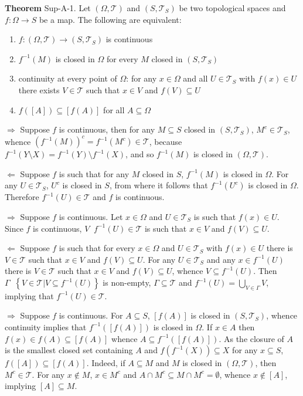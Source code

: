 \documentclass[a4paper]{article}
\newcommand{\obj}[1]{\left\{ #1 \right \}}
\newcommand{\clo}[1]{\left [ #1 \right ]}
\newcommand{\brac}[1]{\left ( #1 \right )}
\newcommand{\induc}[1]{\left . #1 \right \vert}
\newcommand{\Tcal}{\mathcal{T}}
\newcommand{\defn}{\mathop{\overset{\Delta}{=}}\nolimits}
\begin{document}
\label{thm:continuity} \noindent \textbf{Theorem} Sup-A-1.
Let $\brac{\Omega,\Tcal}$ and $\brac{S,\Tcal_S}$ be two topological spaces and $f:\Omega\to S$ be a map. The following are equivalent:
\begin{enumerate}
	\item $f:\brac{\Omega, \Tcal}\to\brac{S, \Tcal_S}$ is continuous
	\item $f^{-1}\brac{M}$ is closed in $\Omega$ for every $M$ closed in $\brac{S, \Tcal_S}$
	\item continuity at every point of $\Omega$: for any $x\in \Omega$ and all $U\in \Tcal_S$ with $f\brac{x}\in U$ there exists $V\in \Tcal$ such that $x\in V$ and $f\brac{V}\subseteq U$
	\item $f\brac{\clo{A}}\subseteq \clo{f\brac{A}}$ for all $A\subseteq \Omega$
\end{enumerate}

$\Rightarrow$ Suppose $f$ is continuous, then for any $M\subseteq S$ closed in $\brac{S,\Tcal_S}$, $M^c\in \Tcal_S$, whence $\brac{f^{-1}\brac{M}}^c = f^{-1}\brac{M^c} \in \Tcal$, because $f^{-1}\brac{Y\setminus X} = f^{-1}\brac{Y}\setminus f^{-1}\brac{X}$, and so $f^{-1}\brac{M}$ is closed in $\brac{\Omega, \Tcal}$.

$\Leftarrow$ Suppose $f$ is such that for any $M$ closed in $S$, $f^{-1}\brac{M}$ is closed in $\Omega$. For any $U\in \Tcal_S$, $U^c$ is closed in $S$, from where it follows that $f^{-1}\brac{U^c}$ is closed in $\Omega$. Therefore $f^{-1}\brac{U}\in \Tcal$ and $f$ is continuous.


$\Rightarrow$ Suppose $f$ is continuous. Let $x\in \Omega$ and $U\in \Tcal_S$ is such that $f\brac{x}\in U$. Since $f$ is continuous, $V\defn f^{-1}\brac{U}\in \Tcal$ is such that $x\in V$ and $f\brac{V}\subseteq U$.

$\Leftarrow$ Suppose $f$ is such that for every $x\in \Omega$ and $U\in \Tcal_S$ with $f\brac{x}\in U$ there is $V\in \Tcal$ such that $x\in V$ and $f\brac{V}\subseteq U$. For any $U\in \Tcal_S$ and any $x\in f^{-1}\brac{U}$ there is $V\in \Tcal$ such that $x\in V$ and $f\brac{V}\subseteq U$, whence $V\subseteq f^{-1}\brac{U}$. Then $\Gamma\defn \obj{\induc{V\in \Tcal} V\subseteq f^{-1}\brac{U}}$ is non-empty, $\Gamma\subseteq \Tcal$ and $f^{-1}\brac{U} = \bigcup_{V\in \Gamma} V$, implying that $f^{-1}\brac{U}\in \Tcal$.


$\Rightarrow$ Suppose $f$ is continuous. For $A\subseteq S$, $\clo{f\brac{A}}$ is closed in $\brac{S,\Tcal_S}$, whence continuity implies that $f^{-1}\brac{\clo{f\brac{A}}}$ is closed in $\Omega$. If $x\in A$ then $f\brac{x}\in f\brac{A}\subseteq \clo{f\brac{A}}$ whence $A\subseteq f^{-1}\brac{\clo{f\brac{A}}}$. As the closure of $A$ is the smallest closed set containing $A$ and $f\brac{f^{-1}\brac{X}}\subseteq X$ for any $x\subseteq S$, $f\brac{\clo{A}}\subseteq \clo{f\brac{A}}$. Indeed, if $A\subseteq M$ and $M$ is closed in $\brac{\Omega, \Tcal}$, then $M^c\in \Tcal$. For any $x\notin M$, $x\in M^c$ and $A\cap M^c\subseteq M\cap M^c=\emptyset$, whence $x\notin \clo{A}$, implying $\clo{A}\subseteq M$.
\end{document}
